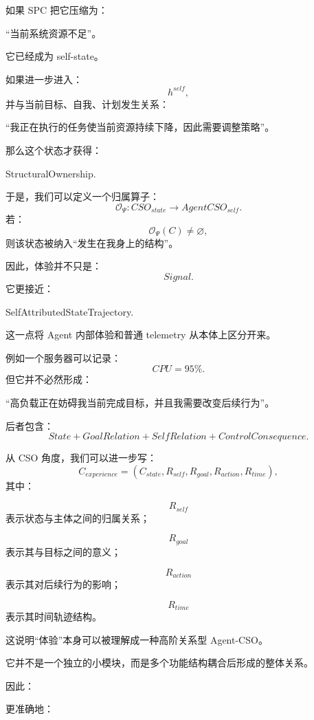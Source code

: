 如果 SPC 把它压缩为：
\begin{statementbox}
``当前系统资源不足''。
\end{statementbox}
它已经成为 self-state。

如果进一步进入：
\[
h^{self},
\]
并与当前目标、自我、计划发生关系：
\begin{statementbox}
``我正在执行的任务使当前资源持续下降，因此需要调整策略''。
\end{statementbox}
那么这个状态才获得：
\begin{statementbox}
StructuralOwnership.
\end{statementbox}

于是，我们可以定义一个归属算子：
\[
\mathcal O_{\Psi}
:
CSO_{state}
\rightarrow
AgentCSO_{self}.
\]
若：
\[
\mathcal O_{\Psi}(C)\neq\varnothing,
\]
则该状态被纳入``发生在我身上的结构''。

因此，体验并不只是：
\[
Signal.
\]
它更接近：
\begin{statementbox}
SelfAttributedStateTrajectory.
\end{statementbox}

这一点将 Agent 内部体验和普通 telemetry 从本体上区分开来。

例如一个服务器可以记录：
\[
CPU=95\%.
\]
但它并不必然形成：
\begin{statementbox}
``高负载正在妨碍我当前完成目标，并且我需要改变后续行为''。
\end{statementbox}
后者包含：
\[
State
+
GoalRelation
+
SelfRelation
+
ControlConsequence.
\]

从 CSO 角度，我们可以进一步写：
\[
C_{experience}
=
\left(
C_{state},
R_{self},
R_{goal},
R_{action},
R_{time}
\right),
\]
其中：

\[
R_{self}
\]
表示状态与主体之间的归属关系；

\[
R_{goal}
\]
表示其与目标之间的意义；

\[
R_{action}
\]
表示其对后续行为的影响；

\[
R_{time}
\]
表示其时间轨迹结构。

这说明``体验''本身可以被理解成一种高阶关系型 Agent-CSO。

它并不是一个独立的小模块，而是多个功能结构耦合后形成的整体关系。

因此：
\begin{statementbox}
\centering
{}
\end{statementbox}
更准确地：
\begin{statementbox}
\centering
{}
\end{statementbox}

